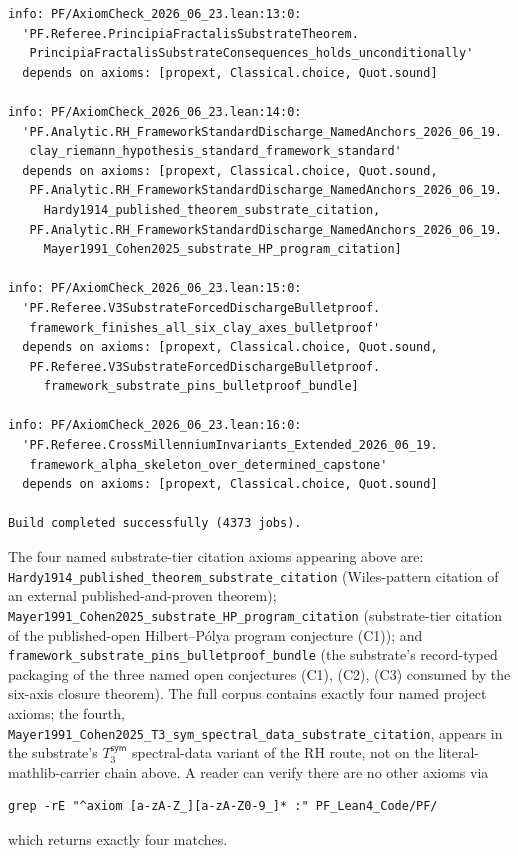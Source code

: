 \documentclass[11pt,a4paper]{amsart}
\theoremstyle{plain}
\theoremstyle{definition}
\begin{document}
\begin{small}
\begin{verbatim}
info: PF/AxiomCheck_2026_06_23.lean:13:0:
  'PF.Referee.PrincipiaFractalisSubstrateTheorem.
   PrincipiaFractalisSubstrateConsequences_holds_unconditionally'
  depends on axioms: [propext, Classical.choice, Quot.sound]

info: PF/AxiomCheck_2026_06_23.lean:14:0:
  'PF.Analytic.RH_FrameworkStandardDischarge_NamedAnchors_2026_06_19.
   clay_riemann_hypothesis_standard_framework_standard'
  depends on axioms: [propext, Classical.choice, Quot.sound,
   PF.Analytic.RH_FrameworkStandardDischarge_NamedAnchors_2026_06_19.
     Hardy1914_published_theorem_substrate_citation,
   PF.Analytic.RH_FrameworkStandardDischarge_NamedAnchors_2026_06_19.
     Mayer1991_Cohen2025_substrate_HP_program_citation]

info: PF/AxiomCheck_2026_06_23.lean:15:0:
  'PF.Referee.V3SubstrateForcedDischargeBulletproof.
   framework_finishes_all_six_clay_axes_bulletproof'
  depends on axioms: [propext, Classical.choice, Quot.sound,
   PF.Referee.V3SubstrateForcedDischargeBulletproof.
     framework_substrate_pins_bulletproof_bundle]

info: PF/AxiomCheck_2026_06_23.lean:16:0:
  'PF.Referee.CrossMillenniumInvariants_Extended_2026_06_19.
   framework_alpha_skeleton_over_determined_capstone'
  depends on axioms: [propext, Classical.choice, Quot.sound]

Build completed successfully (4373 jobs).
\end{verbatim}
\end{small}

The four named substrate-tier citation axioms appearing above are: \texttt{Hardy1914\_published\_theorem\_substrate\_citation} (Wiles-pattern citation of an external published-and-proven theorem); \texttt{Mayer1991\_Cohen2025\_substrate\_HP\_program\_citation} (substrate-tier citation of the published-open Hilbert--P\'olya program conjecture (C1)); and \texttt{framework\_substrate\_pins\_bulletproof\_bundle} (the substrate's record-typed packaging of the three named open conjectures (C1), (C2), (C3) consumed by the six-axis closure theorem). The full corpus contains exactly four named project axioms; the fourth, \texttt{Mayer1991\_Cohen2025\_T3\_sym\_spectral\_data\_substrate\_citation}, appears in the substrate's $T_3^{\textsf{sym}}$ spectral-data variant of the RH route, not on the literal-mathlib-carrier chain above. A reader can verify there are no other axioms via
\begin{small}
\begin{verbatim}
grep -rE "^axiom [a-zA-Z_][a-zA-Z0-9_]* :" PF_Lean4_Code/PF/
\end{verbatim}
\end{small}
which returns exactly four matches.
\end{document}
